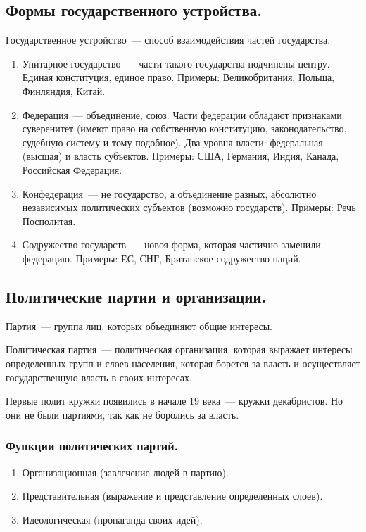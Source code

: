 \documentclass[12pt]{article}
\begin{document}
	\subsection{Формы государственного устройства.}
	\begin{definition}
		Государственное устройство~--- способ взаимодействия частей государства.
	\end{definition}
	\begin{enumerate}
		\item Унитарное государство~--- части такого государства подчинены центру. Единая конституция, единое право. Примеры: Великобритания, Польша, Финляндия, Китай.
		\item Федерация~--- объединение, союз. Части федерации обладают признаками суверенитет (имеют право на собственную конституцию, законодательство, судебную систему и тому подобное). Два уровня власти: федеральная (высшая) и власть субъектов. Примеры: США, Германия, Индия, Канада, Российская Федерация.
		\item Конфедерация~--- не государство, а объединение разных, абсолютно независимых политических субъектов (возможно государств). Примеры: Речь Посполитая.
		\item Содружество государств~--- новоя форма, которая частично заменили федерацию. Примеры: ЕС, СНГ, Британское содружество наций.
	\end{enumerate}
	\subsection{Политические партии и организации.}
	\begin{definition}
		Партия~--- группа лиц, которых объединяют общие интересы.
	\end{definition}
	\begin{definition}
		Политическая партия~--- политическая организация, которая выражает интересы определенных групп и слоев населения, которая борется за власть и осуществляет государственную власть в своих интересах.
	\end{definition}
	\begin{note}
		Первые полит кружки появились в начале 19 века~--- кружки декабристов. Но они не были партиями, так как не боролись за власть.
	\end{note}
	\subsubsection{Функции политических партий.}
	\begin{enumerate}
		\item Организационная (завлечение людей в партию).
		\item Представительная (выражение и представление определенных слоев).
		\item Идеологическая (пропаганда своих идей).
	\end{enumerate}
\end{document}

